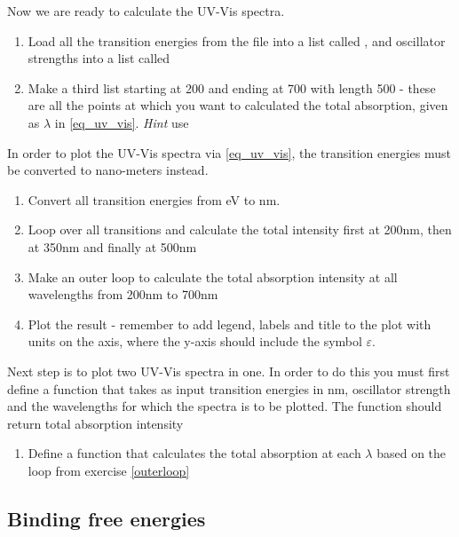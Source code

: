 \documentclass{article}
\begin{document}
Now we are ready to calculate the UV-Vis spectra. 
\begin{enumerate}[resume]
\item Load all the transition energies from the file  into a list called , and oscillator strengths into a list called 
\item Make a third list  starting at 200 and ending at 700 with length 500 - these are all the points at which you want to calculated the total absorption, given as $\lambda$ in \eqref{eq_uv_vis}. \textit{Hint} use 
\end{enumerate}

In order to plot the UV-Vis spectra via \eqref{eq_uv_vis}, the transition energies must be converted to nano-meters instead.

\begin{enumerate}[resume]
\item Convert all transition energies from eV to nm.
\item Loop over all transitions and calculate the total intensity first at 200nm, then at 350nm and finally at 500nm

\item Make an outer loop to calculate the total absorption intensity at all wavelengths from 200nm to 700nm \label{outerloop}
\item Plot the result - remember to add legend, labels and title to the plot with units on the axis, where the y-axis should include the symbol $\varepsilon$.

\end{enumerate}

Next step is to plot two UV-Vis spectra in one. In order to do this you  must first define a function that takes as input transition energies in nm, oscillator strength and the wavelengths for which the spectra is to be plotted. The function should return total absorption intensity

\begin{enumerate}[resume]
\item Define a function that calculates the total absorption at each $\lambda$ based on the loop from exercise \ref{outerloop}
\end{enumerate}


\newpage
\subsection{Binding free energies}
\end{document}
